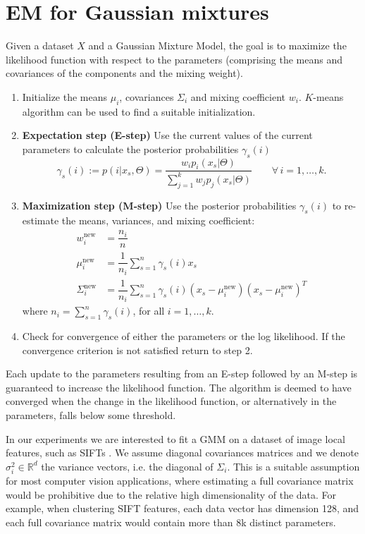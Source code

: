 \documentclass[a4paper,10pt]{article}
\begin{document}
\section{EM for Gaussian mixtures}
Given a dataset $X$ and a Gaussian Mixture Model, the goal is to maximize the likelihood function with respect to the parameters (comprising the means and covariances of the components and the mixing weight). 

\begin{enumerate}
	\item Initialize the means $\mu_i$, covariances $\Sigma_i$ and mixing coefficient $w_i$.  $K$-means algorithm can be used to find a suitable initialization.%
	\item \textbf{Expectation step (E-step)} Use the current values of the current parameters to calculate the posterior probabilities $\gamma_s(i)$
	\begin{equation}
	\gamma_s(i):=p(i|x_s,\Theta)=\dfrac{w_i p_i(x_s|\Theta)}{\sum _{j=1}^k w_j  p_j(x_s|\Theta)} \qquad \forall\, i=1,\dots, k.
	\end{equation}
	\item \textbf{Maximization step (M-step)} Use the posterior probabilities $\gamma_s(i)$ to re-estimate the means, variances, and mixing coefficient:
	\begin{align}
	w_i^{\text{new}}&=\dfrac{n_i}{n}\label{eq:newParam1} \\
	\mu_i^{\text{new}}&=\dfrac{1}{n_i} \sum_{s=1}^{n} \gamma_s(i)x_s \label{eq:newParam2}\\
	\Sigma_i^{\text{new}}&= \dfrac{1}{n_i}\sum_{s=1}^{n} \gamma_s(i) (x_s-\mu_i^{\text{new}})(x_s-\mu_i^{\text{new}})^T
	\label{eq:newParam3}
	\end{align}
	where $n_i=\sum_{s=1}^n \gamma_s(i)$, for all $i=1,\dots,k$.
	\item Check for convergence of either the parameters or the log likelihood. If the convergence criterion is not satisfied return to step 2.
\end{enumerate}

Each update to the parameters resulting from an E-step followed by an M-step is guaranteed to increase the likelihood function. The algorithm is deemed to have converged when the change in the likelihood function, or alternatively in the parameters, falls below some threshold.

In our experiments we are interested to fit a GMM on a dataset of image local features, such as SIFTs \cite{lowe99}. We assume diagonal covariances matrices and we denote $\sigma^2_i\in \mathbb{R}^d$ the variance vectors, i.e. the diagonal of $\Sigma_i$.
This is a suitable assumption for most computer vision applications, where estimating a full covariance matrix would be prohibitive due to the relative high dimensionality of the data. For example, when clustering SIFT features, each data vector has dimension 128, and each full covariance matrix would contain more than 8k distinct parameters.
\end{document}
